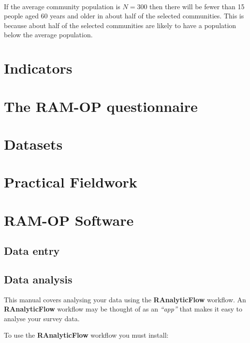 \documentclass[12pt,]{book}
\theoremstyle{definition}
\theoremstyle{definition}
\theoremstyle{definition}
\theoremstyle{remark}
\begin{document}
~

If the average community population is \(N = 300\) then there will be
fewer than 15 people aged 60 years and older in about half of the
selected communities. This is because about half of the selected
communities are likely to have a population below the average
population.

\hypertarget{indicators}{%
\chapter{Indicators}\label{indicators}}

\hypertarget{the-ram-op-questionnaire}{%
\chapter{The RAM-OP questionnaire}\label{the-ram-op-questionnaire}}

\hypertarget{datasets}{%
\chapter{Datasets}\label{datasets}}

\hypertarget{practical}{%
\chapter{Practical Fieldwork}\label{practical}}

\hypertarget{software}{%
\chapter{RAM-OP Software}\label{software}}

\hypertarget{data-entry}{%
\section{Data entry}\label{data-entry}}

\hypertarget{data-analysis}{%
\section{Data analysis}\label{data-analysis}}

This manual covers analysing your data using the \textbf{RAnalyticFlow}
workflow. An \textbf{RAnalyticFlow} workflow may be thought of as an
\emph{``app''} that makes it easy to analyse your survey data.

To use the \textbf{RAnalyticFlow} workflow you must install:
\end{document}

